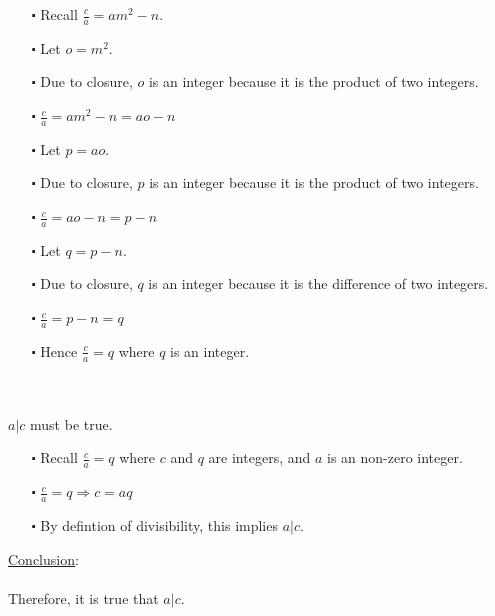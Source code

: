 \documentclass[12pt]{article}
\begin{document}
\begin{itemize}
  \item [$\centerdot$] Recall $\frac{c}{a} = am^2 - n$.
  \item [$\centerdot$] Let $o=m^2$.
  \item [$\centerdot$] Due to closure, $o$ is an integer because it is the product of two integers.
  \item [$\centerdot$] $\frac{c}{a} = am^2 - n = ao - n$
  \item [$\centerdot$] Let $p=ao$.
  \item [$\centerdot$] Due to closure, $p$ is an integer because it is the product of two integers.
  \item [$\centerdot$] $\frac{c}{a} = ao - n = p - n$
  \item [$\centerdot$] Let $q=p-n$.
  \item [$\centerdot$] Due to closure, $q$ is an integer because it is the difference of two integers.
  \item [$\centerdot$] $\frac{c}{a} =p-n=q$
  \item [$\centerdot$] Hence $\frac{c}{a} = q$ where $q$ is an integer.
\end{itemize}
\newblock
\\ \\
$a|c$ must be true.
\begin{itemize}
  \item [$\centerdot$] Recall $\frac{c}{a}=q$ where $c$ and $q$ are integers, and $a$ is an non-zero integer.
  \item [$\centerdot$] $\frac{c}{a}=q \Rightarrow c=aq$
  \item [$\centerdot$] By defintion of divisibility, this implies $a|c$.
\end{itemize}
\underline{Conclusion}:
\\ \\
Therefore, it is true that $a|c$.
\end{document}
